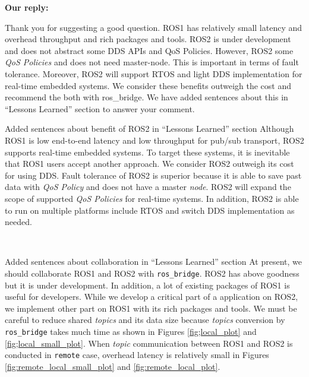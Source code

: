 \documentclass{article}
\begin{document}
\begin{enumerate}
  \begin{flushleft}
    \textbf{Our reply:}
  \end{flushleft}
  Thank you for suggesting a good question.
  ROS1 has relatively small latency and overhead throughput and rich packages and tools.
  ROS2 is under development and does not abstract some DDS APIs and QoS Policies.
  However, ROS2 some \emph{QoS Policies} and does not need master-node.
  This is important in terms of fault tolerance.
  Moreover, ROS2 will support RTOS and light DDS implementation for real-time embedded systems.
  We consider these benefits outweigh the cost and recommend the both with ros\_bridge.
  We have added sentences about this in ``Lessons Learned'' section to answer your comment.
  \begin{itembox}[|]{Added sentences about benefit of ROS2 in ``Lessons Learned'' section}
    Although ROS1 is low end-to-end latency and low throughput for pub/sub transport, ROS2 supports real-time embedded systems.
    To target these systems, it is inevitable that ROS1 users accept another approach.
    We consider ROS2 outweigh its cost for using DDS.
    Fault tolerance of ROS2 is superior because it is able to save past data with \emph{QoS Policy} and does not have a master \emph{node}.
    ROS2 will expand the scope of supported \emph{QoS Policies} for real-time systems.
    In addition, ROS2 is able to run on multiple platforms include RTOS and switch DDS implementation as needed.
  \end{itembox}\\
  \begin{itembox}[|]{Added sentences about collaboration in ``Lessons Learned'' section}
    At present, we should collaborate ROS1 and ROS2 with \texttt{ros\_bridge}.
    ROS2 has above goodness but it is under development.
    In addition, a lot of existing packages of ROS1 is useful for developers.
    While we develop a critical part of a application on ROS2, we implement other part on ROS1 with its rich packages and tools.
    We must be careful to reduce shared \emph{topics} and its data size because \emph{topics} conversion by \texttt{ros\_bridge} takes much time as shown in Figures \ref{fig;local_plot} and \ref{fig;local_small_plot}.
    When \emph{topic} communication between ROS1 and ROS2 is conducted in \texttt{remote} case, overhead latency is relatively small in Figures \ref{fig:remote_local_small_plot} and \ref{fig:remote_local_plot}.
  \end{itembox}\\


\end{enumerate}
\end{document}
